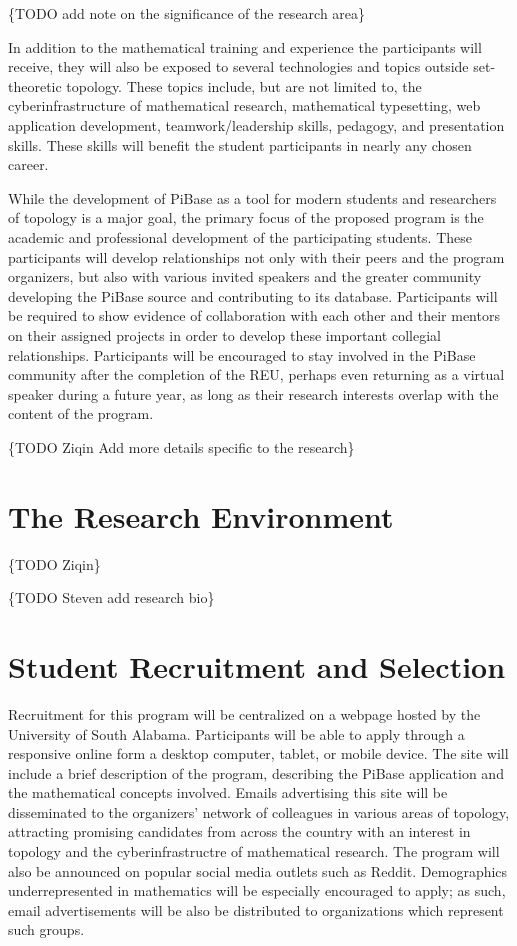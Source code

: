   \{TODO add note on the significance of the research area\}

  In addition to the mathematical training and experience the participants will
  receive, they will also be exposed to several technologies and topics outside
  set-theoretic topology. These topics include, but are not limited to,
  the cyberinfrastructure of mathematical research, mathematical typesetting,
  web application development, teamwork/leadership skills, pedagogy,
  and presentation skills. These skills will benefit the student participants
  in nearly any chosen career.

  While the development of PiBase as a tool for modern students and researchers
  of topology is a major goal, the primary focus of the proposed program
  is the academic and professional development of the participating students.
  These participants will develop relationships not only with their peers
  and the program organizers, but also with various invited speakers and
  the greater community developing the PiBase source and contributing to its
  database. Participants will be
  required to show evidence of collaboration with
  each other and their mentors on their assigned projects in order
  to develop these important collegial relationships. Participants will be
  encouraged to stay involved in the PiBase community after the completion
  of the REU, perhaps even returning as a virtual speaker during a future year,
  as long as their research interests overlap with the content of the program.

  \{TODO Ziqin Add more details specific to the research\}

\section{The Research Environment}

  \{TODO Ziqin\}

  \{TODO Steven add research bio\}

\section{Student Recruitment and Selection}

  Recruitment for this program will be centralized on a webpage hosted
  by the University of South Alabama. Participants will be able to apply
  through a responsive online form a desktop computer, tablet, or mobile device.
  The site will include a brief description of the program, describing the
  PiBase application and the mathematical concepts involved.
  Emails advertising this site will be disseminated to the organizers'
  network of colleagues in various areas of
  topology, attracting promising candidates from across
  the country with an interest in topology and the cyberinfrastructre of
  mathematical research. The program will also be announced on popular social
  media outlets such as Reddit. Demographics underrepresented in mathematics
  will be especially encouraged to apply; as such, email advertisements
  will be also be distributed to organizations which represent such groups.

